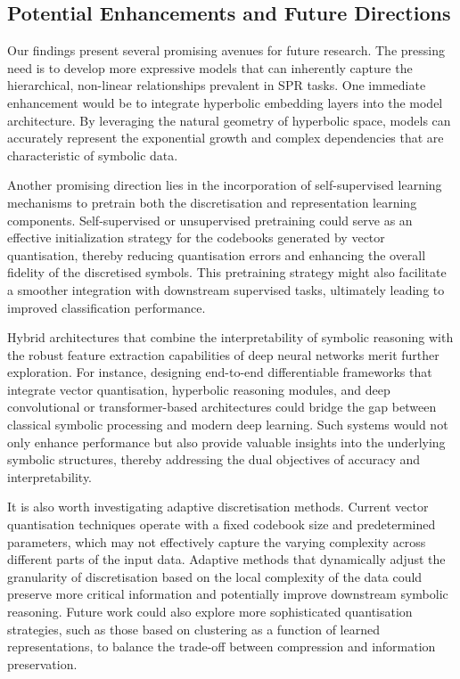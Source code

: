 \documentclass{article}
\begin{document}
\subsection{Potential Enhancements and Future Directions}
Our findings present several promising avenues for future research. The pressing need is to develop more expressive models that can inherently capture the hierarchical, non-linear relationships prevalent in SPR tasks. One immediate enhancement would be to integrate hyperbolic embedding layers into the model architecture. By leveraging the natural geometry of hyperbolic space, models can accurately represent the exponential growth and complex dependencies that are characteristic of symbolic data.

Another promising direction lies in the incorporation of self-supervised learning mechanisms to pretrain both the discretisation and representation learning components. Self-supervised or unsupervised pretraining could serve as an effective initialization strategy for the codebooks generated by vector quantisation, thereby reducing quantisation errors and enhancing the overall fidelity of the discretised symbols. This pretraining strategy might also facilitate a smoother integration with downstream supervised tasks, ultimately leading to improved classification performance.

Hybrid architectures that combine the interpretability of symbolic reasoning with the robust feature extraction capabilities of deep neural networks merit further exploration. For instance, designing end-to-end differentiable frameworks that integrate vector quantisation, hyperbolic reasoning modules, and deep convolutional or transformer-based architectures could bridge the gap between classical symbolic processing and modern deep learning. Such systems would not only enhance performance but also provide valuable insights into the underlying symbolic structures, thereby addressing the dual objectives of accuracy and interpretability.

It is also worth investigating adaptive discretisation methods. Current vector quantisation techniques operate with a fixed codebook size and predetermined parameters, which may not effectively capture the varying complexity across different parts of the input data. Adaptive methods that dynamically adjust the granularity of discretisation based on the local complexity of the data could preserve more critical information and potentially improve downstream symbolic reasoning. Future work could also explore more sophisticated quantisation strategies, such as those based on clustering as a function of learned representations, to balance the trade-off between compression and information preservation.
\end{document}
